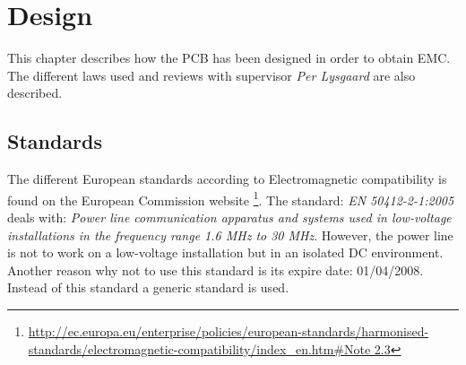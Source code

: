 \chapter{Design}
This chapter describes how the PCB has been designed in order to obtain EMC. The different laws used and reviews with supervisor \textit{Per Lysgaard} are also described. 

\section{Standards}
The different European standards according to Electromagnetic compatibility is found on the European Commission website \footnote{\url{http://ec.europa.eu/enterprise/policies/european-standards/harmonised-standards/electromagnetic-compatibility/index\_en.htm\#Note 2.3}}.
The standard: \textit{EN 50412-2-1:2005} deals with: \textit{Power line communication apparatus and systems used in low-voltage installations in the frequency range 1.6 MHz to 30 MHz}. However, the power line is not to work on a low-voltage installation but in an isolated DC environment. Another reason why not to use this standard is its expire date: 01/04/2008. Instead of this standard a generic standard is used.

